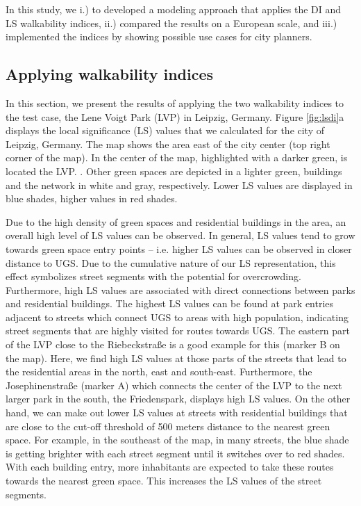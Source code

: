 \documentclass[10pt]{article}
\begin{document}
In this study, we i.) to developed a modeling approach that applies the DI and LS walkability indices, ii.) compared the results on a European scale, and iii.) implemented the indices by showing possible use cases for city planners.

\subsection{Applying walkability indices}
In this section, we present the results of applying the two walkability indices to the test case, the Lene Voigt Park (LVP) in Leipzig, Germany.
Figure \ref{fig:lsdi}a displays the local significance (LS) values that we calculated for the city of Leipzig, Germany.
The map shows the area east of the city center (top right corner of the map). 
In the center of the map, highlighted with a darker green, is located the LVP. .
Other green spaces are depicted in a lighter green, buildings and the network in white and gray, respectively.
Lower LS values are displayed in blue shades, higher values in red shades.

Due to the high density of green spaces and residential buildings in the area, an overall high level of LS values can be observed.
In general, LS values tend to grow towards green space entry points – i.e. higher LS values can be observed in closer distance to UGS.
Due to the cumulative nature of our LS representation, this effect symbolizes street segments with the potential for overcrowding.
Furthermore, high LS values are associated with direct connections between parks and residential buildings.
The highest LS values can be found at park entries adjacent to streets which connect UGS to areas with high population, indicating street segments that are highly visited for routes towards UGS. 
The eastern part of the LVP close to the Riebeckstraße is a good example for this (marker B on the map). 
Here, we find high LS values at those parts of the streets that lead to the residential areas in the north, east and south-east.
Furthermore, the Josephinenstraße (marker A) which connects the center of the LVP to the next larger park in the south, the Friedenspark, displays high LS values.
On the other hand, we can make out lower LS values at streets with residential buildings that are close to the cut-off threshold of 500 meters distance to the nearest green space.
For example, in the southeast of the map, in many streets, the blue shade is getting brighter with each street segment until it switches over to red shades.
With each building entry, more inhabitants are expected to take these routes towards the nearest green space.
This increases the LS values of the street segments.
\end{document}
